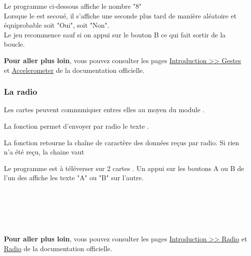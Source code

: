 \begin{methode}
Le programme ci-dessous affiche le nombre "8"\\
Lorsque le \mb est secoué, il s'affiche une seconde plus tard de manière aléatoire et équiprobable soit "Oui", soit "Non".\\
Le jeu recommence sauf si on appui sur le bouton B ce qui fait sortir de la boucle.

\end{methode}

\begin{remarque}
\textbf{Pour aller plus loin}, vous pouvez consulter les pages  \href{https://microbit-micropython.readthedocs.io/fr/latest/tutorials/gestures.html}{Introduction >> Gestes} et \href{https://microbit-micropython.readthedocs.io/fr/latest/accelerometer.html}{Accelerometer} de la documentation officielle.
\end{remarque}


\subsubsection{La radio}

Les cartes \mb peuvent communiquer entres elles au moyen du module .

La fonction  permet d'envoyer par radio le texte .

La fonction  retourne la chaîne de caractère des données reçus par radio. Si rien n'a été reçu, la chaine vaut 

\begin{methode}
Le programme est à téléverser sur 2 cartes \mb. Un appui sur les boutons A ou B de l'un des \mb affiche les texte "A" ou "B" sur l'autre.

\\
\\
\\
\\
\end{methode}

\begin{remarque}
\textbf{Pour aller plus loin}, vous pouvez consulter les pages  \href{https://microbit-micropython.readthedocs.io/fr/latest/tutorials/radio.html}{Introduction >> Radio} et \href{https://microbit-micropython.readthedocs.io/fr/latest/radio.html}{Radio} de la documentation officielle.
\end{remarque}


